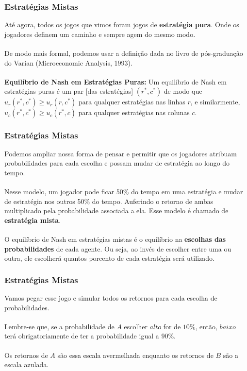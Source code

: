 \documentclass{beamer}[10]
\begin{document}
\begin{frame}
	\frametitle{Estratégias Mistas}

	Até agora, todos os jogos que vimos foram jogos de \textbf{estratégia pura}. Onde os jogadores definem um caminho e sempre agem do mesmo modo.
	\\~\\
	De modo mais formal, podemos usar a definição dada no livro de pós-graduação do Varian (Microeconomic Analysis, 1993).
	\\~\\
	\textbf{Equilíbrio de Nash em Estratégias Puras:} Um equilíbrio de Nash em estratégias puras é um par [das estratégias] $(r^*,c^*)$ de modo que $u_r(r^*,c^*) \geq u_r(r,c^*)$ para qualquer estratégias nas linhas $r$, e similarmente, $u_c(r^*,c^*) \geq u_c(r^*,c)$ para qualquer estratégias nas colunas $c$.

\end{frame}

\begin{frame}
	\frametitle{Estratégias Mistas}

	Podemos ampliar nossa forma de pensar e permitir que os jogadores atribuam probabilidades para cada escolha e possam mudar de estratégia ao longo do tempo.
	\\~\\
	Nesse modelo, um jogador pode ficar 50\% do tempo em uma estratégia e mudar de estratégia nos outros 50\% do tempo. Auferindo o retorno de ambas multiplicado pela probabilidade associada a ela. Esse modelo é chamado de \textbf{estratégia mista}.
	\\~\\
	O equilíbrio de Nash em estratégias mistas é o equilíbrio na \textbf{escolhas das probabilidades} de cada agente. Ou seja, ao invés de escolher entre uma ou outra, ele escolherá quantos porcento de cada estratégia será utilizado. 

\end{frame}

\begin{frame}
	\frametitle{Estratégias Mistas}

	Vamos pegar esse jogo e simular todos os retornos para cada escolha de probabilidades. 
	\\~\\
	Lembre-se que, se a probabilidade de $A$ escolher $alto$ for de $10\%$, então, $baixo$ terá obrigatoriamente de ter a probabilidade igual a $90\%$. 
	\\~\\
	Os retornos de $A$ são essa escala avermelhada enquanto os retornos de $B$ são a escala azulada.

\end{frame}
\end{document}
